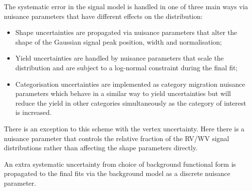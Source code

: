 The systematic error in the signal model is handled in one of three main ways via nuisance parameters that have different effects on the \mgg distribution:
\begin{itemize}[noitemsep]
    \item Shape uncertainties are propagated via nuisance parameters that alter the shape of the Gaussian signal peak position, width and normalisation;
    \item Yield uncertainties are handled by nuisance parameters that scale the \mgg distribution and are subject to a log-normal constraint during the final fit;
    \item Categorisation uncertainties are implemented as category migration nuisance parameters which behave in a similar way to yield uncertainties but will reduce the yield in other categories simultaneously as the category of interest is increased.
\end{itemize}
There is an exception to this scheme with the vertex uncertainty. Here there is a nuisance parameter that controls the relative fraction of the RV/WV signal distributions rather than affecting the shape parameters directly. 

An extra systematic uncertainty from choice of background functional form is propagated to the final fits via the background model as a discrete nuisance parameter. 



